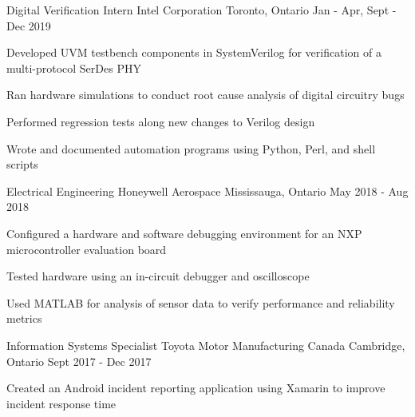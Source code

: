 

\begin{cventries}

  \cventry
    {Digital Verification Intern} %
    {Intel Corporation} %
    {Toronto, Ontario} %
    {Jan - Apr, Sept - Dec 2019} %
    {
      \begin{cvitems} %
        \item {Developed UVM testbench components in SystemVerilog for verification of a multi-protocol SerDes PHY}
        \item {Ran hardware simulations to conduct root cause analysis of digital circuitry bugs}
        \item {Performed regression tests along new changes to Verilog design}
        \item {Wrote and documented automation programs using Python, Perl, and shell scripts}
      \end{cvitems}
    }

  \cventry
    {Electrical Engineering} %
    {Honeywell Aerospace} %
    {Mississauga, Ontario} %
    {May 2018 - Aug 2018} %
    {
      \begin{cvitems} %
        \item {Configured a hardware and software debugging environment for an NXP microcontroller evaluation board}
        \item {Tested hardware using an in-circuit debugger and oscilloscope}
        \item {Used MATLAB for analysis of sensor data to verify performance and reliability metrics}
      \end{cvitems}
    }

  \cventry
    {Information Systems Specialist} %
    {Toyota Motor Manufacturing Canada} %
    {Cambridge, Ontario} %
    {Sept 2017 - Dec 2017} %
    {
      \begin{cvitems} %
        \item {Created an Android incident reporting application using Xamarin to improve incident response time}
      \end{cvitems}
    }


\end{cventries}
